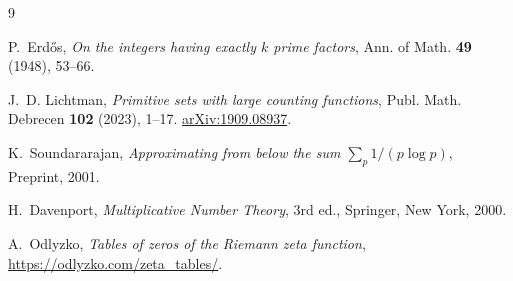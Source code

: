 \documentclass[11pt,a4paper]{article}
\begin{document}
\begin{thebibliography}{9}

P.~Erd\H{o}s,
\textit{On the integers having exactly $k$ prime factors},
Ann. of Math. \textbf{49} (1948), 53--66.

J.~D. Lichtman,
\textit{Primitive sets with large counting functions},
Publ. Math. Debrecen \textbf{102} (2023), 1--17.
\href{https://arxiv.org/abs/1909.08937}{arXiv:1909.08937}.

K.~Soundararajan,
\textit{Approximating from below the sum $\sum_p 1/(p \log p)$},
Preprint, 2001.

H.~Davenport,
\textit{Multiplicative Number Theory}, 3rd ed.,
Springer, New York, 2000.

A.~Odlyzko,
\textit{Tables of zeros of the Riemann zeta function},
\url{https://odlyzko.com/zeta\_tables/}.

\end{thebibliography}
\end{document}

